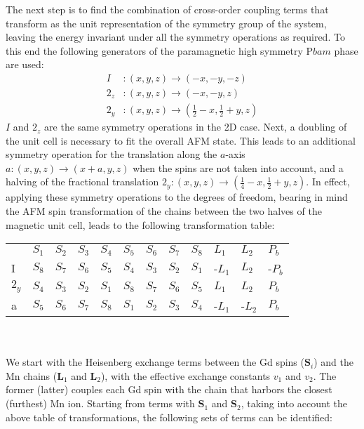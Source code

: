 The next step is to find the combination of cross-order coupling terms that transform as the unit representation of the symmetry group of the system, leaving the energy invariant under all the symmetry operations as required.
To this end the following generators of the paramagnetic high symmetry P$bam$ phase are used:
\begin{align}
	I &: (x, y, z) \rightarrow (-x, -y, -z)\\
	2_z &: (x, y, z) \rightarrow (-x, -y, z)\\
	2_y &: (x, y, z) \rightarrow (\frac{1}{2} - x, \frac{1}{2} + y, z)
\end{align}
$I$ and $2_z$ are the same symmetry operations in the 2D case. Next, a doubling of the unit cell is necessary to fit the overall AFM state. This leads to an additional symmetry operation for the translation along the $a$-axis $a: (x, y, z) \rightarrow (x + a, y, z)$ when the spins are not taken into account, and a halving of the fractional translation $2_y: (x, y, z) \rightarrow (\frac{1}{4} - x, \frac{1}{2}+y, z)$.
In effect, applying these symmetry operations to the degrees of freedom, bearing in mind the AFM spin transformation of the chains between the two halves of the magnetic unit cell, leads to the following transformation table:
\begin{table}[h]
\centering
\begin{tabular}{|l|lllllllllll|}
\cline{1-12}
 & $S_1$ & $S_2$ & $S_3$ & $S_4$ & $S_5$ & $S_6$ & $S_7$ & $S_8$ & $L_1$ & $L_2$ & $P_b$ \\ \cline{1-12}
I & $S_8$ & $S_7$ & $S_6$ & $S_5$ & $S_4$ & $S_3$ & $S_2$ & $S_1$ & -$L_1$ & $L_2$ & -$P_b$ \\ \cline{1-12}
$2_y$ & $S_4$ & $S_3$ & $S_2$ & $S_1$ & $S_8$ & $S_7$ & $S_6$ & $S_5$ & $L_1$ & $L_2$ & $P_b$ \\ \cline{1-12}
a & $S_5$ & $S_6$ & $S_7$ & $S_8$ & $S_1$ & $S_2$ & $S_3$ & $S_4$ & -$L_1$ & -$L_2$ & $P_b$ \\ \cline{1-12}
\end{tabular}
\end{table}\\\\
We start with the Heisenberg exchange terms between the Gd spins ($\mathbf{S}_i$) and the Mn chains ($\mathbf{L}_1$ and $\mathbf{L}_2$), with the effective exchange constants $v_1$ and $v_2$.
The former (latter) couples each Gd spin with the chain that harbors the closest (furthest) Mn ion.
Starting from terms with $\mathbf{S}_1$ and $\mathbf{S}_2$, taking into account the above table of transformations, the following sets of terms can be identified:
